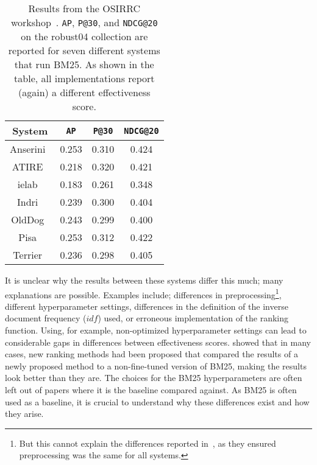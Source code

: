 \begin{table}
	\centering
	\caption{Results from the OSIRRC workshop~\citep{OSIRRC}. \texttt{AP}, \texttt{P@30}, and \texttt{NDCG@20} on the robust04 collection are reported for seven different systems that run BM25. As shown in the table, all implementations report (again) a different effectiveness score.}
	\label{osirrc_results}
	\begin{tabular}{c c c c}
		\toprule
		System & \texttt{AP} & \texttt{P@30} & \texttt{NDCG@20} \\
		\midrule
		Anserini~\citep{anserini-docker} & 0.253 & 0.310 & 0.424 \\
		ATIRE~\citep{ATIRE} & 0.218 & 0.320 & 0.421 \\
		ielab~\citep{ielab} & 0.183 & 0.261 & 0.348 \\
		Indri~\citep{indri-docker} & 0.239 & 0.300 & 0.404 \\
		OldDog~\citep{olddog-docker} & 0.243 & 0.299 & 0.400 \\
		Pisa~\citep{pisa} & 0.253 & 0.312 & 0.422 \\
		Terrier~\citep{terrier-docker} & 0.236 & 0.298 & 0.405 \\
		\bottomrule
	\end{tabular}
\end{table}

It is unclear why the results between these systems differ this much; many explanations are possible. Examples include; differences in preprocessing\footnote{But this cannot explain the differences reported in~\citeauthor{OldDog}, as they ensured preprocessing was the same for all systems.}, different hyperparameter settings, differences in the definition of the inverse document frequency ($idf$) used, or erroneous implementation of the ranking function. Using, for example, non-optimized hyperparameter settings can lead to considerable gaps in differences between effectiveness scores. \citet{weak-baselines} showed that in many cases, new ranking methods had been proposed that compared the results of a newly proposed method to a non-fine-tuned version of BM25, making the results look better than they are. The choices for the BM25 hyperparameters are often left out of papers where it is the baseline compared against. As BM25 is often used as a baseline, it is crucial to understand why these differences exist and how they arise.

